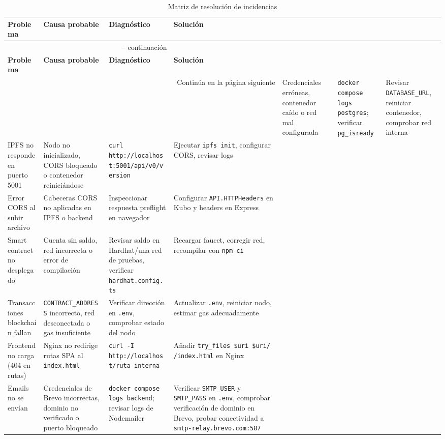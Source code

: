 \documentclass[11pt, a4paper]{article}
\begin{document}
\begin{longtable}{@{}p{3.5cm}p{3.5cm}p{4cm}p{3.5cm}@{}}
\caption{Matriz de resoluci\'{o}n de incidencias} \\
\toprule
\textbf{Problema} & \textbf{Causa probable} & \textbf{Diagn\'{o}stico} & \textbf{Soluci\'{o}n} \\
\midrule
\endfirsthead
\multicolumn{4}{c}{\tablename\ \thetable{} -- continuaci\'{o}n} \\
\toprule
\textbf{Problema} & \textbf{Causa probable} & \textbf{Diagn\'{o}stico} & \textbf{Soluci\'{o}n} \\
\midrule
\endhead
\midrule
\multicolumn{4}{r}{Contin\'{u}a en la p\'{a}gina siguiente}
\endfoot
\bottomrule
\endlastfoot
No se puede conectar a PostgreSQL & Credenciales err\'{o}neas, contenedor ca\'{i}do o red mal configurada & \texttt{docker compose logs postgres}; verificar \texttt{pg\_isready} & Revisar \texttt{DATABASE\_URL}, reiniciar contenedor, comprobar red interna \\
IPFS no responde en puerto 5001 & Nodo no inicializado, CORS bloqueado o contenedor reinici\'{a}ndose & \texttt{curl http://localhost:5001/api/v0/version} & Ejecutar \texttt{ipfs init}, configurar CORS, revisar logs \\
Error CORS al subir archivo & Cabeceras CORS no aplicadas en IPFS o backend & Inspeccionar respuesta preflight en navegador & Configurar \texttt{API.HTTPHeaders} en Kubo y headers en Express \\
Smart contract no desplegado & Cuenta sin saldo, red incorrecta o error de compilaci\'{o}n & Revisar saldo en Hardhat/una red de pruebas, verificar \texttt{hardhat.config.ts} & Recargar faucet, corregir red, recompilar con \texttt{npm ci} \\
Transacciones blockchain fallan & \texttt{CONTRACT\_ADDRESS} incorrecto, red desconectada o gas insuficiente & Verificar direcci\'{o}n en \texttt{.env}, comprobar estado del nodo & Actualizar \texttt{.env}, reiniciar nodo, estimar gas adecuadamente \\
Frontend no carga (404 en rutas) & Nginx no redirige rutas SPA al \texttt{index.html} & \texttt{curl -I http://localhost/ruta-interna} & A\~{n}adir \texttt{try\_files \$uri \$uri/ /index.html} en Nginx \\
Emails no se env\'{i}an & Credenciales de Brevo incorrectas, dominio no verificado o puerto bloqueado & \texttt{docker compose logs backend}; revisar logs de Nodemailer & Verificar \texttt{SMTP\_USER} y \texttt{SMTP\_PASS} en \texttt{.env}, comprobar verificaci\'{o}n de dominio en Brevo, probar conectividad a \texttt{smtp-relay.brevo.com:587} \\

\end{longtable}
\end{document}

